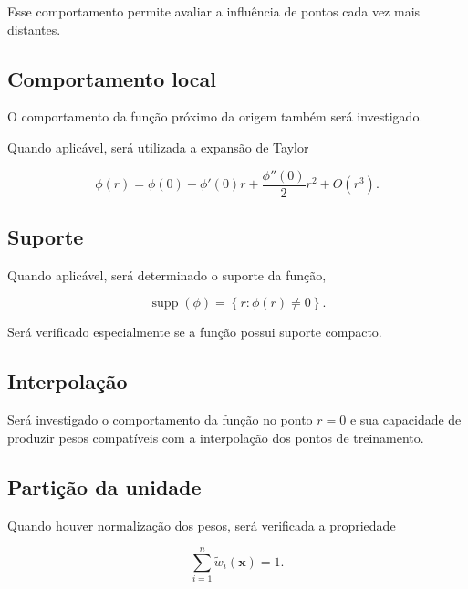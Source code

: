 \documentclass[12pt,a4paper]{article}
\begin{document}
	Esse comportamento permite avaliar a influência de pontos cada vez mais
	distantes.
	
	\subsection{Comportamento local}
	
	O comportamento da função próximo da origem também será investigado.
	
	Quando aplicável, será utilizada a expansão de Taylor
	
	\begin{equation}
		\phi(r)
		=
		\phi(0)
		+
		\phi'(0)r
		+
		\frac{\phi''(0)}{2}r^2
		+
		O(r^3).
	\end{equation}
	
	\subsection{Suporte}
	
	Quando aplicável, será determinado o suporte da função,
	
	\begin{equation}
		\operatorname{supp}(\phi)
		=
		\left\{
		r:
		\phi(r)\neq0
		\right\}.
	\end{equation}
	
	Será verificado especialmente se a função possui suporte compacto.
	
	\subsection{Interpolação}
	
	Será investigado o comportamento da função no ponto $r=0$ e sua
	capacidade de produzir pesos compatíveis com a interpolação dos pontos
	de treinamento.
	
	\subsection{Partição da unidade}
	
	Quando houver normalização dos pesos, será verificada a propriedade
	
	\begin{equation}
		\sum_{i=1}^{n}
		\widetilde{w}_i(\mathbf{x})
		=
		1.
	\end{equation}
	
	
\end{document}

